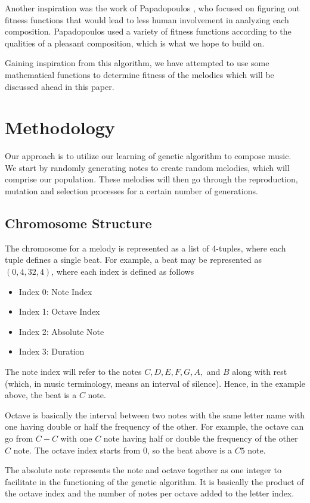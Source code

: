 \documentclass[conference]{IEEEtran}
\begin{document}
Another inspiration was the work of Papadopoulos \cite{b3}, who focused on figuring out fitness functions that would lead to less human involvement in analyzing each composition. Papadopoulos used a variety of fitness functions according to the qualities of a pleasant composition, which is what we hope to build on.

Gaining inspiration from this algorithm, we have attempted to use some mathematical functions to determine fitness of the melodies which will be discussed ahead in this paper. 

\section{Methodology}
Our approach is to utilize our learning of genetic algorithm to compose music. We start by randomly generating notes to create random melodies, which will comprise our population. These melodies will then go through the reproduction, mutation and selection processes for a certain number of generations.

\subsection{Chromosome Structure}
The chromosome for a melody is represented as a list of 4-tuples, where each tuple defines a single beat. For example, a beat may be represented as $(0, 4, 32, 4)$, where each index is defined as follows
\begin{itemize}
	\item Index 0: Note Index
	\item Index 1: Octave Index
	\item Index 2: Absolute Note
	\item Index 3: Duration
\end{itemize}

The note index will refer to the notes $C, D, E, F, G, A,$ and $B$ along with rest (which, in music terminology, means an interval of silence). Hence, in the example above, the beat is a $C$ note.

Octave is basically the interval between two notes with the same letter name with one having double or half the frequency of the other. For example, the octave can go from $C-C$ with one $C$ note having half or double the frequency of the other $C$ note. The octave index starts from 0, so the beat above is a $C5$ note.

The absolute note represents the note and octave together as one integer to facilitate in the functioning of the genetic algorithm. It is basically the product of the octave index and the number of notes per octave added to the letter index.
\end{document}
